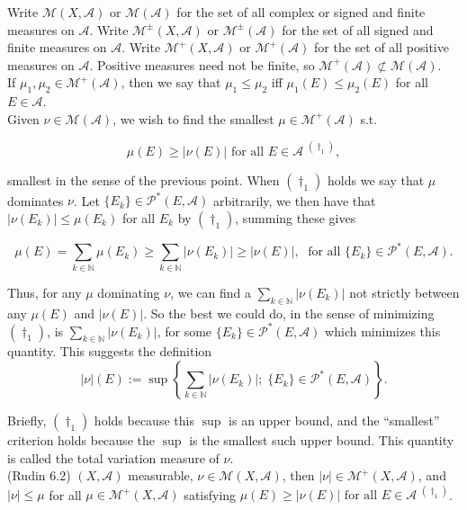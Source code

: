 \documentclass[12pt]{article}
\newcommand{\partset}[1]{ \mathcal{P}^{*}(#1) }
\newcommand{\fall}[0] { \textrm{ for all } }
\newcommand{\nats}[0] { \mathbb{N}}
\newcommand{\A}[0] { \mathcal{A} }
\newcommand{\M}[0] { \mathcal{M} }
\begin{document}
Write $\M(X,\A)$ or $\M(\A)$ for the set of all complex or signed and finite measures on $\A$.
Write $\M^\pm(X,\A)$ or $\M^\pm(\A)$ for the set of all signed and finite measures on $\A$.
Write $\M^+(X,\A)$ or $\M^+(\A)$ for the set of all positive measures on $\A$. 
Positive measures need not be finite, so $\M^+(\A) \not \subset \M(\A)$.
\\



If $\mu_1,\mu_2 \in \M^+(\A)$, then we say that $\mu_1 \le \mu_2$ iff $\mu_1(E) \le \mu_2(E)$ for all $E \in \A$.\\

Given $\nu \in \M(\A)$, we wish to find the smallest $\mu \in \M^+(\A)$ s.t.

$$
     \mu(E)  \ge |\nu(E)| \fall E \in \A  \; {}^{(\dagger_1)},
$$
 
\noindent
smallest in the sense of the previous point. When ${(\dagger_1)}$ holds we say that $\mu$ dominates $\nu$.  Let $\{ E_k \} \in \partset{E,\A}$ arbitrarily, we then have that $|\nu(E_k)| \le \mu(E_k)$ for all $E_k$ by ${(\dagger_1)}$, summing these gives 

$$
\mu(E) = \sum_{k \in \nats} \mu(E_k) \ge \sum_{k \in \nats} |\nu(E_k)| \ge | \nu(E)|, \; \fall \{ E_k\} \in \partset{E, \A}.
$$

\noindent
Thus, for any $\mu$ dominating $\nu$, we can find a $\sum_{k \in \nats} |\nu(E_k)|$ not strictly between any $\mu(E)$ and $|\nu(E)|$. So the best we could do, in the sense of minimizing ${(\dagger_1)}$, is $\sum_{k \in \nats} |\nu(E_k)|$, for some $ \{ E_k\} \in \partset{E, \A}$ which minimizes this quantity. This suggests the definition\\

$$
|\nu|(E) := \sup \left\{  \sum_{k \in \nats} |\nu(E_k)| ; \; \{ E_k\} \in \partset{E, \A}  \right\}.
$$

\noindent   
Briefly, ${(\dagger_1)}$ holds because this $\sup$ is an upper bound, and the ``smallest'' criterion holds because the $\sup$ is the smallest such upper bound. This quantity is called the total variation measure of $\nu$. \\






(Rudin 6.2) $(X, \A)$ measurable, $\nu \in \M(X,\A)$, then $|\nu| \in \M^+(X, \A)$, and $|\nu| \le \mu$ for all $\mu  \in \M^+(X, \A)$ satisfying  $\mu(E)  \ge |\nu(E)| \fall E \in \A \; {}^{(\dagger_1)} $. \\
\end{document}
